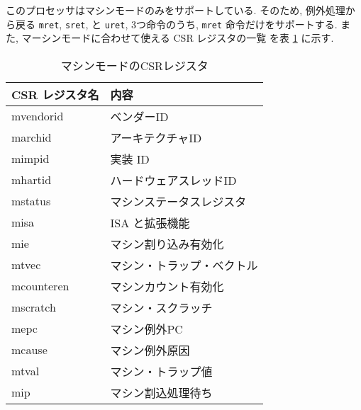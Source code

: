 \documentclass[../specifications.tex]{subfiles}
\begin{document}
  このプロセッサはマシンモードのみをサポートしている.
  そのため, 例外処理から戻る \verb|mret|, \verb|sret|, と \verb|uret|, 
  3つ命令のうち, \verb|mret| 命令だけをサポートする.
  また, マーシンモードに合わせて使える CSR レジスタの一覧
  \cite{riscv-reader} \cite{riscv-priviledged}
  を表 \ref{table:csrs} に示す.

  \begin{table}[h]
    \caption{マシンモードのCSRレジスタ}
    \label{table:csrs}
    \begin{tabular}{|l|l|}
    \hline
    CSR レジスタ名 & 内容 \\ \hline
    mvendorid & ベンダーID \\
    marchid & アーキテクチャID \\
    mimpid & 実装 ID \\
    mhartid & ハードウェアスレッドID \\
    mstatus & マシンステータスレジスタ \\
    misa & ISA と拡張機能 \\
    mie & マシン割り込み有効化 \\
    mtvec & マシン・トラップ・ベクトル \\
    mcounteren & マシンカウント有効化 \\
    mscratch & マシン・スクラッチ \\
    mepc & マシン例外PC \\
    mcause & マシン例外原因 \\
    mtval & マシン・トラップ値 \\
    mip & マシン割込処理待ち \\ \hline
    \end{tabular}
  \end{table}
  
\end{document}
